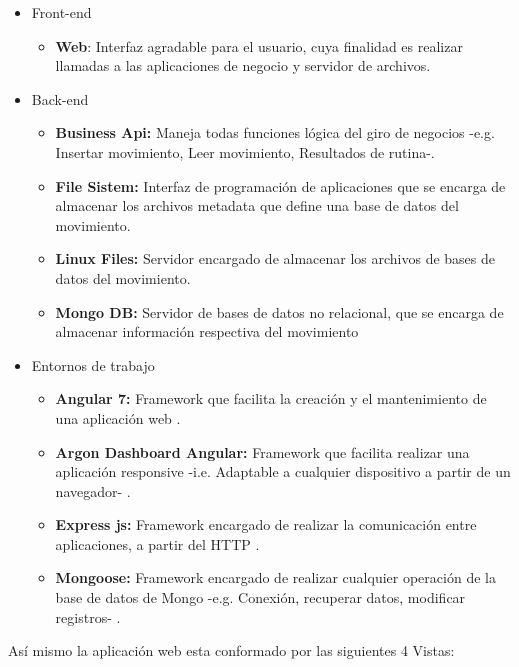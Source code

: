 \begin{itemize}
\item Front-end
	\begin{itemize}
	\item \textbf{Web}: Interfaz agradable para el usuario, cuya finalidad es realizar llamadas a las aplicaciones de negocio y servidor de archivos.
	\end{itemize}
\item Back-end
	\begin{itemize}
	\item \textbf{Business Api:} Maneja todas funciones l\'ogica del giro de negocios -e.g. Insertar movimiento, Leer movimiento, Resultados de rutina-.
	\item \textbf{File Sistem:} Interfaz de programaci\'on de aplicaciones que se encarga de almacenar los archivos metadata que define una base de datos del movimiento.
		\item \textbf{Linux Files:} Servidor encargado de almacenar los archivos de bases de datos del movimiento.
		\item \textbf{Mongo DB:} Servidor de bases de datos no relacional, que se encarga de almacenar informaci\'on respectiva del movimiento
	\end{itemize}
\item Entornos de trabajo
\begin{itemize}
\item \textbf{Angular 7:} Framework que facilita la creaci\'on y el mantenimiento de una aplicaci\'on web \cite{angular2019}.
\item \textbf{Argon Dashboard Angular:} Framework que facilita realizar una aplicaci\'on responsive -i.e. Adaptable a cualquier dispositivo a partir de un navegador- \cite{argonDash}.
\item \textbf{Express js:} Framework encargado de realizar la comunicaci\'on entre aplicaciones, a partir del \acrlong{HTTP} \cite{fileSistem2019}.
\item \textbf{Mongoose:} Framework encargado de realizar cualquier operaci\'on de la base de datos de Mongo -e.g. Conexi\'on, recuperar datos, modificar registros- \cite{mongoose2019}.
\end{itemize}
\end{itemize}
As\'i mismo la aplicaci\'on web esta conformado por las siguientes 4 Vistas:
